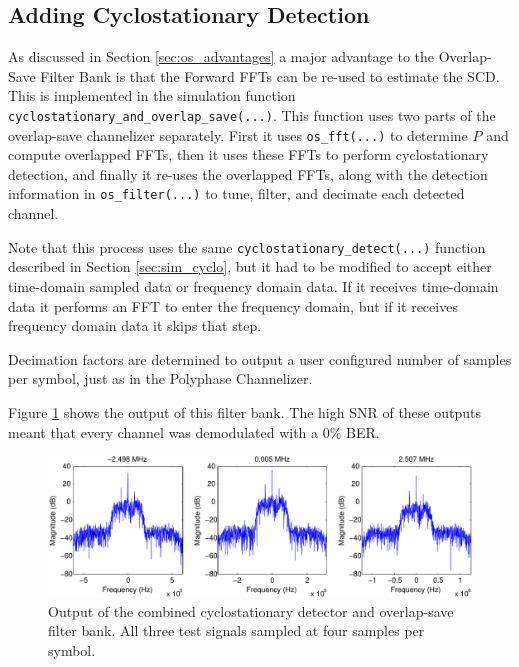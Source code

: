 \documentclass[12pt]{report}
\begin{document}
\subsection{Adding Cyclostationary Detection}
\label{sec:sim_os_cyclo}
As discussed in Section \ref{sec:os_advantages} a major advantage to the
Overlap-Save Filter Bank is that the Forward FFTs can be re-used to estimate
the SCD. This is implemented in the simulation function
\texttt{cyclostationary\_and\_overlap\_save(...)}. This function uses two parts of the
overlap-save channelizer separately.  First it uses \texttt{os\_fft(...)} to
determine $P$ and compute overlapped FFTs, then it uses these FFTs to perform
cyclostationary detection, and finally it re-uses the overlapped FFTs, along
with the detection information in \texttt{os\_filter(...)} to tune, filter, and
decimate each detected channel.

Note that this process uses the same \texttt{cyclostationary\_detect(...)}
function described in Section \ref{sec:sim_cyclo}, but it had to be modified to
accept either time-domain sampled data or frequency domain data. If it receives
time-domain data it performs an FFT to enter the frequency domain, but if it
receives frequency domain data it skips that step.

Decimation factors are determined to output a user configured number of samples
per symbol, just as in the Polyphase Channelizer.

Figure \ref{fig:cyclo_os_results} shows the output of this filter bank. The
high SNR of these outputs meant that every channel was demodulated with a 0\%
BER.

\begin{figure}[bh!]
    \includegraphics[width=\textwidth]{cyclo_os_results}%
    \caption{Output of the combined cyclostationary detector and overlap-save filter bank. All three test signals sampled at four samples per symbol.}
    \label{fig:cyclo_os_results}
\end{figure}
\end{document}
